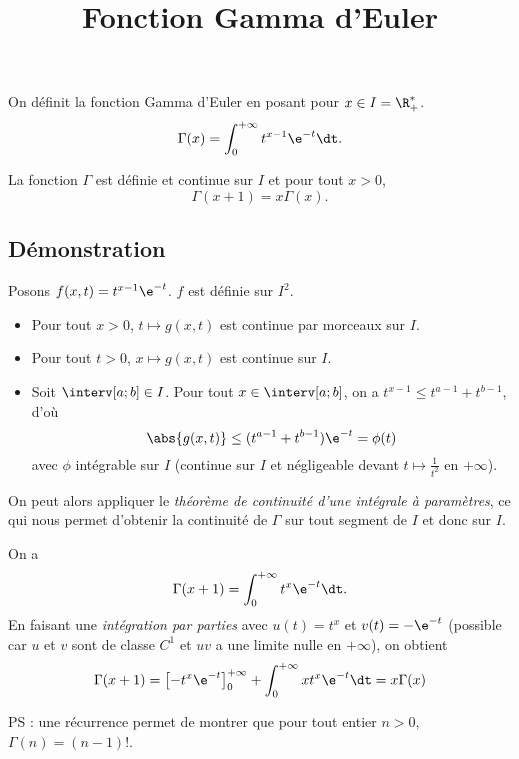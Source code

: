 \documentclass[fontsize=12pt,twoside=false,parskip=half, french]{scrartcl}
\title{Fonction Gamma d’Euler}
\date{}
\author{}
\begin{document}
\maketitle
    On définit la fonction Gamma d’Euler en posant pour $x \in I = \R_+^*$.
    \[
      \Gamma(x) = \int_0^{+\infty} t^{x - 1} \e^{-t} \dt.
    \]
   \begin{Theoreme}
      La fonction $\Gamma$ est définie et continue sur $I$ et pour tout $x > 0$,
      \[
         \Gamma(x + 1) = x\Gamma(x).
      \]
   \end{Theoreme}
   \subsection{Démonstration}
      Posons $f(x, t) = t^{x - 1} \e^{-t}$. $f$ est définie sur $I^2$.
      \begin{itemize}
         \item Pour tout $x > 0$, $t \mapsto g(x,  t)$ est continue par morceaux sur $I$.
         \item Pour tout $t > 0$, $x \mapsto g(x,  t)$ est continue sur $I$.
         \item Soit $\interv[a; b] \in I$. Pour tout $x \in \interv[a; b]$, on a $t^{x - 1} \leq t^{a - 1} + t^{b - 1}$, d’où
            \[
               \abs{g(x, t)} \leq (t^{a - 1} + t^{b - 1})\e^{-t} = \phi(t)
            \]
            avec $\phi$ intégrable sur $I$ (continue sur $I$ et négligeable devant $t \mapsto \frac{1}{t^2}$ en $+\infty$). 
      \end{itemize}
      On peut alors appliquer le \emph{théorème de continuité d’une intégrale à paramètres}, ce qui nous permet d’obtenir la continuité de $\Gamma$ sur tout segment de $I$
      et donc sur $I$.
      
      On a 
      \[
         \Gamma(x + 1) = \int_0^{+\infty} t^{x} \e^{-t} \dt.
      \]
      En faisant une \emph{intégration par parties} avec $u(t) = t^x$ et $v(t) = -\e^{-t}$ (possible car $u$ et $v$ sont de classe $C^1$ et $uv$ a une limite nulle en $+\infty$), on obtient
      \[
         \Gamma(x + 1) = \left[-t^x\e^{-t}\right]_0^{+\infty} + \int_0^{+\infty} xt^{x} \e^{-t} \dt = x\Gamma(x)
      \]
      
      PS : une récurrence permet de montrer que pour tout entier $n > 0$, $\Gamma(n) = (n - 1)!$.
\end{document}
